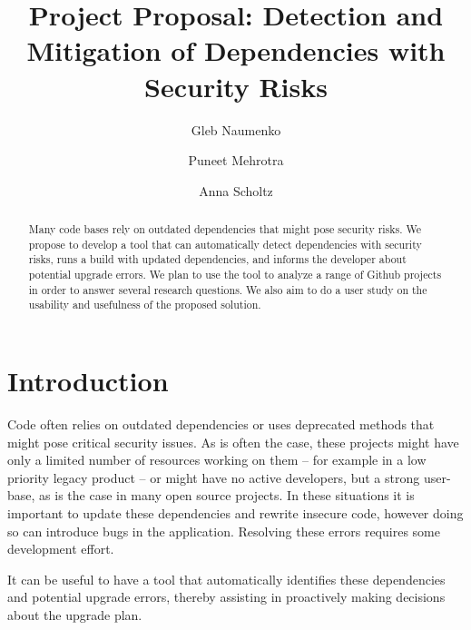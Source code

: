 \documentclass[sigconf]{acmart}
\begin{document}
\title{Project Proposal: Detection and Mitigation of Dependencies with Security Risks}


\author{Gleb Naumenko}


\author{Puneet Mehrotra}


\author{Anna Scholtz}






\begin{abstract}
Many code bases rely on outdated dependencies that might pose security risks. We propose to develop a tool that can automatically detect dependencies with security risks, runs a build with updated dependencies, and informs the developer about potential upgrade errors. We plan to use the tool to analyze a range of Github projects in order to answer several research questions. We also aim to do a user study on the usability and usefulness of the proposed solution.
\end{abstract}



\maketitle

\section{Introduction}

Code often relies on outdated dependencies or uses deprecated methods that might pose critical security issues. As is often the case, these projects might have only a limited number of resources working on them -- for example in a low priority legacy product -- or might have no active developers, but a strong user-base, as is the case in many open source projects. In these situations it is important to update these dependencies and rewrite insecure code, however doing so can introduce bugs in the application. Resolving these errors requires some development effort. 

It can be useful to have a tool that automatically identifies these dependencies and potential upgrade errors, thereby assisting in proactively making decisions about the upgrade plan.
\end{document}

